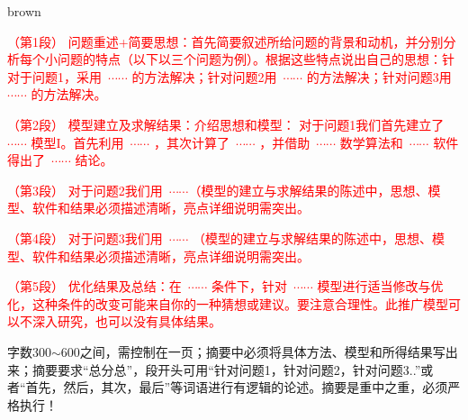 brown

{\song\xiaosihao
\setlength{\parindent}{2em}\textcolor{red}{（第1段）	问题重述+简要思想：首先简要叙述所给问题的背景和动机，并分别分析每个小问题的特点（以下以三个问题为例）。根据这些特点说出自己的思想：针对于问题1，采用~$\cdots \cdots$ 的方法解决；针对问题2用~$\cdots \cdots$ 的方法解决；针对问题3用~$\cdots \cdots$ 的方法解决。}


\setlength{\parindent}{2em}\textcolor{red}{（第2段）	模型建立及求解结果：介绍思想和模型： 对于问题1我们首先建立了~$\cdots \cdots$ 模型I。首先利用~$\cdots \cdots$ ，其次计算了~$\cdots \cdots$ ，并借助~$\cdots \cdots$ 数学算法和~$\cdots \cdots$ 软件得出了~$\cdots \cdots$ 结论。}

\setlength{\parindent}{2em} \textcolor{red}{（第3段）	对于问题2我们用~$\cdots \cdots$（模型的建立与求解结果的陈述中，思想、模型、软件和结果必须描述清晰，亮点详细说明需突出。}

\setlength{\parindent}{2em}\textcolor{red}{（第4段）	对于问题3我们用~$\cdots \cdots$ （模型的建立与求解结果的陈述中，思想、模型、软件和结果必须描述清晰，亮点详细说明需突出。}

\setlength{\parindent}{2em}\textcolor{red}{（第5段）	优化结果及总结：在~$\cdots \cdots$ 条件下，针对~$\cdots \cdots$ 模型进行适当修改与优化，这种条件的改变可能来自你的一种猜想或建议。要注意合理性。此推广模型可以不深入研究，也可以没有具体结果。}
}

\begin{rmk}
字数300$\sim $600之间，需控制在一页；摘要中必须将具体方法、模型和所得结果写出来；摘要要求“总分总”，段开头可用“针对问题1，针对问题2，针对问题3..”或者“首先，然后，其次，最后”等词语进行有逻辑的论述。摘要是重中之重，必须严格执行！
\end{rmk}





